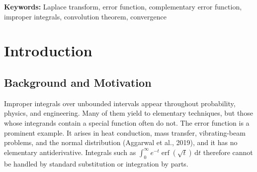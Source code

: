 \documentclass[12pt,a4paper]{article}
\theoremstyle{definition}
\theoremstyle{plain}
\theoremstyle{remark}
\newcommand{\erf}{\operatorname{erf}}
\newcommand{\Lap}[1]{\mathcal{L}\!\left\{#1\right\}}
\newcommand{\dd}{\,\mathrm{d}}
\begin{document}
	\setcounter{page}{1}
	
	\begin{abstract}
		\noindent This paper presents an exposition and critical peer review of the article ``Application of Laplace Transform for Solving Improper Integrals whose Integrand Consisting Error Function'' by Aggarwal et al.\ (2019). The paper re-derives the Laplace transform of $\erf(\sqrt{t})$ by two routes: a term-by-term Maclaurin series, which is valid for $s>1$, and an integral-representation argument, which is valid for all $s>0$. The result, $1/\bigl(s\sqrt{s+1}\bigr)$, is combined with the shifting, change-of-scale, differentiation, integration, multiplication-by-$t$, and convolution properties to evaluate six improper integrals involving the error function. Each exact value is compared with independent adaptive numerical quadrature and agrees to at least six significant digits. The truncation error of the series is analysed through the alternating-series bound. The review identifies several flaws in the article: an incorrect limit for the complementary error function, an incorrect expression for $\Lap{t\,\erf(\sqrt{t})}$, a misstated change-of-scale property, missing convergence conditions on the parameter $s$, and an inconsistent issue number. The worked results themselves are correct. The paper concludes that the Laplace-transform method is an exact and economical alternative to direct integration, provided that the region of convergence is stated and checked.
	\end{abstract}
	
	\noindent\textbf{Keywords:} Laplace transform, error function, complementary error function, improper integrals, convolution theorem, convergence
	
	\newpage
	\tableofcontents
	\listoffigures
	\listoftables
	\newpage
	
	\setcounter{page}{1}
	
	\section{Introduction}
	
	\subsection{Background and Motivation}
	
	Improper integrals over unbounded intervals appear throughout probability, physics, and engineering. Many of them yield to elementary techniques, but those whose integrands contain a special function often do not. The error function is a prominent example. It arises in heat conduction, mass transfer, vibrating-beam problems, and the normal distribution (Aggarwal et al., 2019), and it has no elementary antiderivative. Integrals such as $\int_0^\infty e^{-t}\erf(\sqrt{t})\dd t$ therefore cannot be handled by standard substitution or integration by parts.
	
\end{document}
